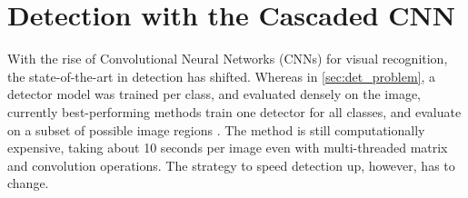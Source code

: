 \chapter{Detection with the Cascaded CNN}

With the rise of Convolutional Neural Networks (CNNs) for visual recognition, the state-of-the-art in detection has shifted.
Whereas in \autoref{sec:det_problem}, a detector model was trained per class, and evaluated densely on the image, currently best-performing methods train one detector for all classes, and evaluate on a subset of possible image regions \parencite{Girshick-CVPR-2014}.
The method is still computationally expensive, taking about 10 seconds per image even with multi-threaded matrix and convolution operations.
The strategy to speed detection up, however, has to change.




